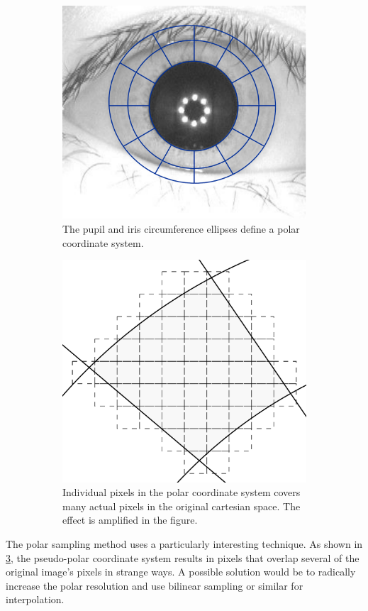 \begin{figure}
    \begin{subfigure}{0.5\linewidth}
        \centering
        \includegraphics[width=0.6\linewidth]{figures/polar-image.pdf}
        \caption{The pupil and iris circumference ellipses define a polar coordinate system.}
        \label{fig:polar-method-a}
    \end{subfigure}
    \begin{subfigure}{0.5\linewidth}
        \centering
        \includegraphics[width=0.6\linewidth]{figures/polar-method.pdf}
        \caption{Individual pixels in the polar coordinate system covers many actual pixels in the original cartesian space. The effect is amplified in the figure.}
        \label{fig:polar-method-b}
    \end{subfigure}
    \caption{}\label{fig:polar-method}
\end{figure}

The polar sampling method uses a particularly interesting technique. As shown in \cref{fig:polar-method}, the pseudo-polar coordinate system results in pixels that overlap several of the original image's pixels in strange ways. A possible solution would be to radically increase the polar resolution and use bilinear sampling or similar for interpolation. 

